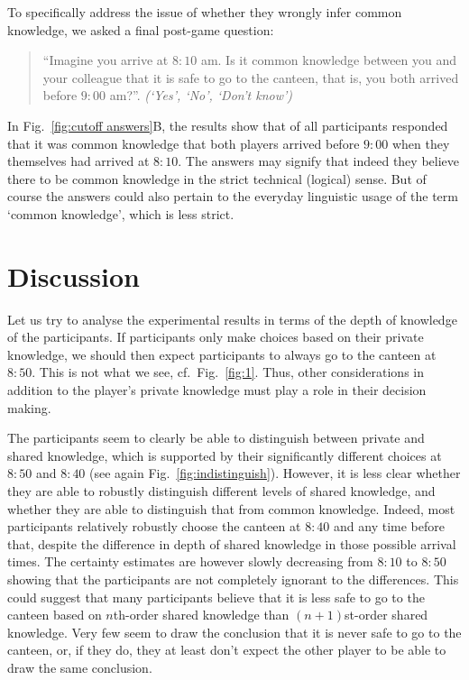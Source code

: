 To specifically address the issue of whether they wrongly infer common knowledge, we asked a final post-game question:
\begin{quote}
\indent
``Imagine you arrive at $8{:}10$ am. Is it common knowledge between you and your colleague that it is safe to go to the canteen, that is, you both arrived before $9{:}00$ am?''. \textit{(`Yes', `No', `Don't know')}
\end{quote}
\noindent
In Fig.~\ref{fig:cutoff answers}B, the results show that  of all participants responded that it was common knowledge that both players arrived before $9{:}00$ when they themselves had arrived at $8{:}10$. The answers may signify that indeed they believe there to be common knowledge in the strict technical (logical) sense. But of course the answers could also pertain to the everyday linguistic usage of the term `common knowledge', which is less strict.


\section{Discussion}\label{discussion}
Let us try to analyse the experimental results in terms of the depth of knowledge of the participants. If participants only make choices based on their private knowledge, we should then expect participants to always go to the canteen at $8{:}50$. This is not what we see, cf.\ Fig.~\ref{fig:1}. Thus, other considerations in addition to the player's private knowledge must play a role in their decision making.

The participants seem to clearly be able to distinguish between private and shared knowledge, which is supported by their significantly different choices at $8{:}50$ and $8{:}40$ (see again Fig.~\ref{fig:indistinguish}). However, it is less clear whether they are able to robustly distinguish different levels of shared knowledge, and whether they are able to distinguish that from common knowledge. Indeed, most participants relatively robustly choose the canteen at $8{:}40$ and any time before that, despite the difference in depth of shared knowledge in those possible arrival times. The certainty estimates are however slowly decreasing from $8{:}10$ to $8{:}50$  showing that the participants are not completely ignorant to the differences. This could suggest that many participants believe that it is less safe to go to the canteen based on $n$th-order shared knowledge than $(n+1)$st-order shared knowledge. Very few seem to draw the conclusion that it is never safe to go to the canteen, or, if they do, they at least don't expect the other player to be able to draw the same conclusion. 

